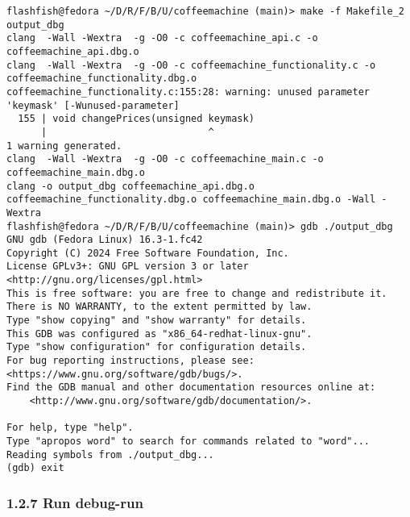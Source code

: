 \documentclass{report}
\begin{document}
\begin{lstlisting}[style=cppstyle, title=\texttt{Terminal Output}]
flashfish@fedora ~/D/R/F/B/U/coffeemachine (main)> make -f Makefile_2 output_dbg
clang  -Wall -Wextra  -g -O0 -c coffeemachine_api.c -o coffeemachine_api.dbg.o
clang  -Wall -Wextra  -g -O0 -c coffeemachine_functionality.c -o coffeemachine_functionality.dbg.o
coffeemachine_functionality.c:155:28: warning: unused parameter 'keymask' [-Wunused-parameter]
  155 | void changePrices(unsigned keymask)
      |                            ^
1 warning generated.
clang  -Wall -Wextra  -g -O0 -c coffeemachine_main.c -o coffeemachine_main.dbg.o
clang -o output_dbg coffeemachine_api.dbg.o coffeemachine_functionality.dbg.o coffeemachine_main.dbg.o -Wall -Wextra
flashfish@fedora ~/D/R/F/B/U/coffeemachine (main)> gdb ./output_dbg
GNU gdb (Fedora Linux) 16.3-1.fc42
Copyright (C) 2024 Free Software Foundation, Inc.
License GPLv3+: GNU GPL version 3 or later <http://gnu.org/licenses/gpl.html>
This is free software: you are free to change and redistribute it.
There is NO WARRANTY, to the extent permitted by law.
Type "show copying" and "show warranty" for details.
This GDB was configured as "x86_64-redhat-linux-gnu".
Type "show configuration" for configuration details.
For bug reporting instructions, please see:
<https://www.gnu.org/software/gdb/bugs/>.
Find the GDB manual and other documentation resources online at:
    <http://www.gnu.org/software/gdb/documentation/>.

For help, type "help".
Type "apropos word" to search for commands related to "word"...
Reading symbols from ./output_dbg...
(gdb) exit
\end{lstlisting}


\subsubsection*{1.2.7 Run debug-run}
\end{document}
